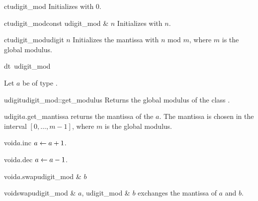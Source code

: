 
\CONS

\begin{fcode}{ct}{udigit_mod}{}
  Initializes with $0$.
\end{fcode}

\begin{fcode}{ct}{udigit_mod}{const udigit_mod & $n$}
  Initializes with $n$.
\end{fcode}

\begin{fcode}{ct}{udigit_mod}{udigit $n$}
  Initializes the mantissa with $n$ mod $m$, where $m$ is the global modulus.
\end{fcode}

\begin{fcode}{dt}{~udigit_mod}{}
\end{fcode}



\ACCS

Let $a$ be of type .

\begin{fcode}{udigit}{udigit_mod::get_modulus}{}
  Returns the global modulus of the class .
\end{fcode}

\begin{fcode}{udigit}{$a$.get_mantissa}{}
  returns the mantissa of the  $a$.  The mantissa is chosen in the interval
  $[0, \dots, m-1]$, where $m$ is the global modulus.
\end{fcode}



\MODF

\begin{fcode}{void}{$a$.inc}{}
  $a \leftarrow a + 1$.
\end{fcode}

\begin{fcode}{void}{$a$.dec}{}
  $a \leftarrow a - 1$.
\end{fcode}

\begin{fcode}{void}{$a$.swap}{udigit_mod & $b$}\end{fcode}
\begin{fcode}{void}{swap}{udigit_mod & $a$, udigit_mod & $b$}
  exchanges the mantissa of $a$ and $b$.
\end{fcode}


